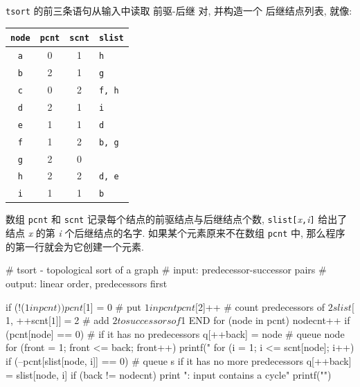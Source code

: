 \texttt{tsort} 的前三条语句从输入中读取 \mbox{前驱}-后继 对, 并构造一个
后继结点列表, 就像:
\begin{center}
\begin{tabular}{c|c|c|l}
    \hline
    \hline
    \texttt{node}  & \texttt{pcnt} & \texttt{scnt} & \texttt{slist} \\
    \hline
    \texttt{a}  & 0 & 1 & \texttt{h} \\
    \texttt{b}  & 2 & 1 & \texttt{g} \\
    \texttt{c}  & 0 & 2 & \texttt{f, h} \\
    \texttt{d}  & 2 & 1 & \texttt{i} \\
    \texttt{e}  & 1 & 1 & \texttt{d} \\
    \texttt{f}  & 1 & 2 & \texttt{b, g} \\
    \texttt{g}  & 2 & 0 &  \\
    \texttt{h}  & 2 & 2 & \texttt{d, e}  \\
    \texttt{i}  & 1 & 1 & \texttt{b}  \\
    \hline
\end{tabular}
\end{center}

数组 \texttt{pcnt} 和 \texttt{scnt} 记录每个结点的前驱结点与后继结点个数,
\texttt{slist[}\textit{x}\texttt{,}\textit{i}\texttt{]} 给出了结点 
\textit{x} 的第 \textit{i} 个后继结点的名字. 如果某个元素原来不在数组
\texttt{pcnt} 中, 那么程序的第一行就会为它创建一个元素.
\begin{awkcode}
    # tsort - topological sort of a graph
    #   input:  predecessor-successor pairs
    #   output: linear order, predecessors first

        { if (!($1 in pcnt))
              pcnt[$1] = 0           # put $1 in pcnt
          pcnt[$2]++                 # count predecessors of $2
          slist[$1, ++scnt[$1]] = $2 # add $2 to successors of $1
        }
    END { for (node in pcnt) {
              nodecnt++
              if (pcnt[node] == 0)   # if it has no predecessors
                  q[++back] = node   # queue node
          }
          for (front = 1; front <= back; front++) {
              printf(" %
              for (i = 1; i <= scnt[node]; i++)
                  if (--pcnt[slist[node, i]] == 0)
                      # queue s if it has no more predecessors
                      q[++back] = slist[node, i]
          }
          if (back != nodecnt)
              print "\nerror: input contains a cycle"
          printf("\n")
        }
\end{awkcode}

